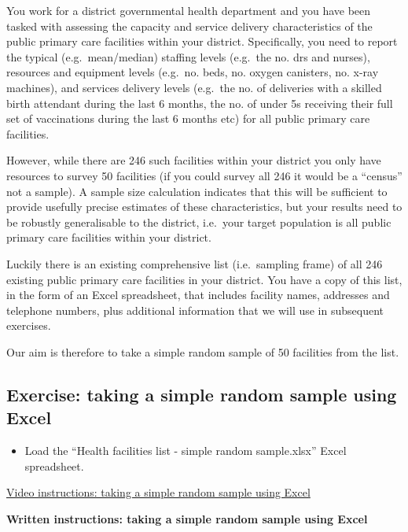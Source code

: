 \documentclass[
]{book}
\providecommand{\tightlist}{%
  \setlength{\itemsep}{0pt}\setlength{\parskip}{0pt}}
\begin{document}
You work for a district governmental health department and you have been tasked with assessing the capacity and service delivery characteristics of the public primary care facilities within your district. Specifically, you need to report the typical (e.g.~mean/median) staffing levels (e.g.~the no. drs and nurses), resources and equipment levels (e.g.~no. beds, no. oxygen canisters, no. x-ray machines), and services delivery levels (e.g.~the no. of deliveries with a skilled birth attendant during the last 6 months, the no. of under 5s receiving their full set of vaccinations during the last 6 months etc) for all public primary care facilities.

However, while there are 246 such facilities within your district you only have resources to survey 50 facilities (if you could survey all 246 it would be a ``census'' not a sample). A sample size calculation indicates that this will be sufficient to provide usefully precise estimates of these characteristics, but your results need to be robustly generalisable to the district, i.e.~your target population is all public primary care facilities within your district.

Luckily there is an existing comprehensive list (i.e.~sampling frame) of all 246 existing public primary care facilities in your district. You have a copy of this list, in the form of an Excel spreadsheet, that includes facility names, addresses and telephone numbers, plus additional information that we will use in subsequent exercises.

Our aim is therefore to take a simple random sample of 50 facilities from the list.

\hypertarget{exercise-taking-a-simple-random-sample-using-excel}{%
\subsection{Exercise: taking a simple random sample using Excel}\label{exercise-taking-a-simple-random-sample-using-excel}}

\begin{itemize}
\tightlist
\item
  Load the ``Health facilities list - simple random sample.xlsx'' Excel spreadsheet.
\end{itemize}

\href{https://youtu.be/GrHFm7VlNt4}{Video instructions: taking a simple random sample using Excel}

\textbf{Written instructions: taking a simple random sample using Excel}
\end{document}
